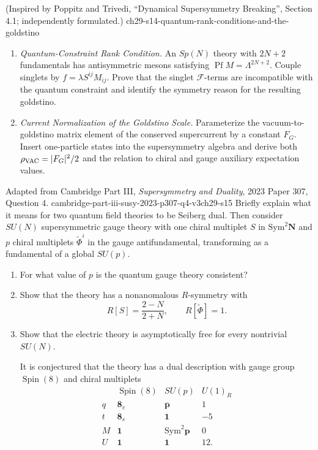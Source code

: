 \begin{enumerate}
    {(Inspired by Poppitz and Trivedi, ``Dynamical Supersymmetry Breaking'', Section 4.1; independently formulated.)}
    {ch29-s14-quantum-rank-conditions-and-the-goldstino}
  \begin{enumerate}
    \item \emph{Quantum-Constraint Rank Condition.}
    An \(Sp(N)\) theory with \(2N+2\) fundamentals has antisymmetric mesons
      satisfying \(\operatorname{Pf}M=\Lambda^{2N+2}\).  Couple singlets by
      \(f=\lambda S^{ij}M_{ij}\).  Prove that the singlet
      \(\mathcal F\)-terms are incompatible with the quantum constraint and
      identify the symmetry reason for the resulting goldstino.
    \item \emph{Current Normalization of the Goldstino Scale.}
    Parameterize the vacuum-to-goldstino matrix element of the conserved
      supercurrent by a constant \(F_G\).  Insert one-particle states into
      the supersymmetry algebra and derive both
      \(\rho_{\rm VAC}=\lvert F_G\rvert^2/2\) and the relation to chiral and
      gauge auxiliary expectation values.
  \end{enumerate}

    {Adapted from Cambridge Part III, \emph{Supersymmetry and Duality},
    2023 Paper 307, Question 4.}
    {cambridge-part-iii-susy-2023-p307-q4-v3ch29-s15}
  Briefly explain what it means for two quantum field theories to be
  Seiberg dual.  Then consider \(SU(N)\) supersymmetric gauge theory with
  one chiral multiplet \(S\) in \(\mathrm{Sym}^2\boldsymbol N\) and
  \(p\) chiral multiplets \(\widetilde\Phi^i\) in the gauge
  antifundamental, transforming as a fundamental of a global \(SU(p)\).
  \begin{enumerate}
    \item[(i)] For what value of \(p\) is the quantum gauge theory
    consistent?

    \item[(ii)] Show that the theory has a nonanomalous \(R\)-symmetry with
    \[
      R[S]=\frac{2-N}{2+N},
      \qquad R[\widetilde\Phi]=1.
      \tag{29.15.1}
    \]

    \item[(iii)] Show that the electric theory is asymptotically free for
    every nontrivial \(SU(N)\).

    It is conjectured that the theory has a dual description with gauge
    group \(\operatorname{Spin}(8)\) and chiral multiplets
    \[
    \begin{array}{c|ccc}
       &\operatorname{Spin}(8)&SU(p)&U(1)_R\\ \hline
      q&\boldsymbol8_v&\overline{\boldsymbol p}&1\\
      t&\boldsymbol8_s&\boldsymbol1&-5\\
      M&\boldsymbol1&\mathrm{Sym}^2\boldsymbol p&0\\
      U&\boldsymbol1&\boldsymbol1&12 .
    \end{array}
    \tag{29.15.2}
    \]


\end{enumerate}
\end{enumerate}
